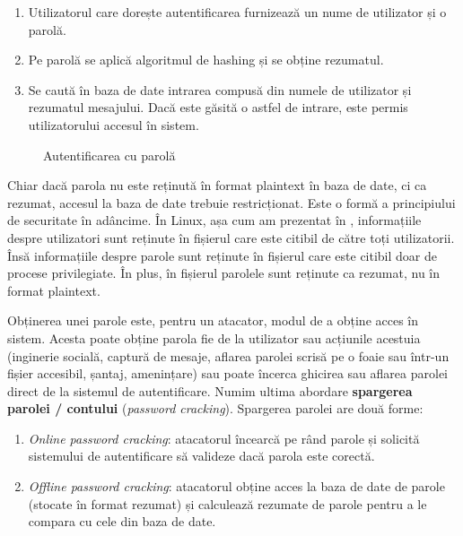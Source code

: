 \begin{enumerate}
  \item Utilizatorul care dorește autentificarea furnizează un nume de utilizator și o parolă.
  \item Pe parolă se aplică algoritmul de hashing și se obține rezumatul.
  \item Se caută în baza de date intrarea compusă din numele de utilizator și rezumatul mesajului. Dacă este găsită o astfel de intrare, este permis utilizatorului accesul în sistem.
\end{enumerate}

\begin{figure}[htbp]
  \centering
  \def\svgwidth{\columnwidth}
  
  \caption{Autentificarea cu parolă}
  \label{fig:sec:password-auth-hashing}
\end{figure}

Chiar dacă parola nu este reținută în format plaintext în baza de date, ci ca rezumat, accesul la baza de date trebuie restricționat. Este o formă a principiului de securitate în adâncime. În Linux, așa cum am prezentat în , informațiile despre utilizatori sunt reținute în fișierul  care este citibil de către toți utilizatorii. Însă informațiile despre parole sunt reținute în fișierul  care este citibil doar de procese privilegiate. În plus, în fișierul  parolele sunt reținute ca rezumat, nu în format plaintext.

Obținerea unei parole este, pentru un atacator, modul de a obține acces în sistem. Acesta poate obține parola fie de la utilizator sau acțiunile acestuia (inginerie socială, captură de mesaje, aflarea parolei scrisă pe o foaie sau într-un fișier accesibil, șantaj, amenințare) sau poate încerca ghicirea sau aflarea parolei direct de la sistemul de autentificare. Numim ultima abordare \textbf{spargerea parolei / contului} (\textit{password cracking}). Spargerea parolei are două forme:

\begin{enumerate}
  \item \textit{Online password cracking}: atacatorul încearcă pe rând parole și solicită sistemului de autentificare să valideze dacă parola este corectă.
  \item \textit{Offline password cracking}: atacatorul obține acces la baza de date de parole (stocate în format rezumat) și calculează rezumate de parole pentru a le compara cu cele din baza de date.
\end{enumerate}

